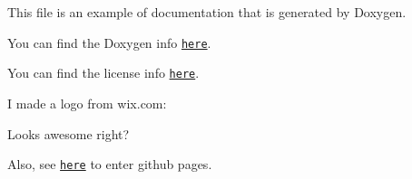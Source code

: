 This file is an example of documentation that is generated by Doxygen.

You can find the Doxygen info \href{http://www.stack.nl/~dimitri/doxygen/index.html}{\tt here}.

You can find the license info \href{https://choosealicense.com/}{\tt here}.

I made a logo from wix.\+com\+:



Looks awesome right?

Also, see \href{https://chao8219.github.io/Doxygen_Example/}{\tt here} to enter github pages. 